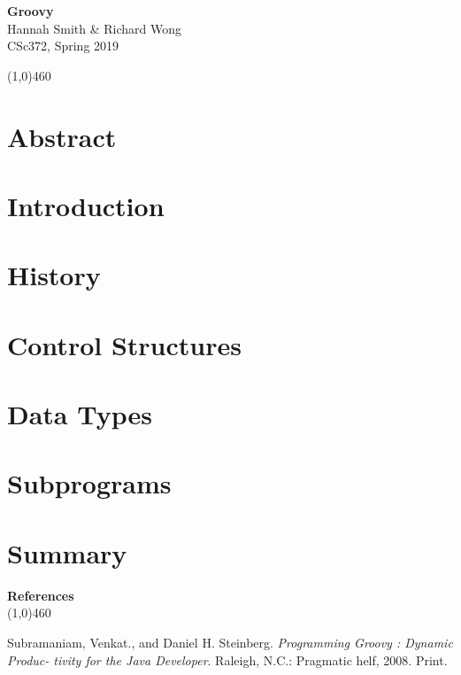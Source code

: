 \documentclass[12pt]{article}
\begin{document}
\begin{center}
    {\bf \large\fontsize{15}{15} \selectfont Groovy} \\
    {Hannah Smith \& Richard Wong} \\
    {CSc372, Spring 2019}\\
\end{center}

\begin{center}
\line(1,0){460}
\end{center}

\section*{\fontsize{14}{15}\selectfont Abstract}

\section*{\fontsize{14}{15}\selectfont Introduction}

\section*{\fontsize{14}{15}\selectfont History}

\section*{\fontsize{14}{15}\selectfont Control Structures}

\section*{\fontsize{14}{15}\selectfont Data Types}

\section*{\fontsize{14}{15}\selectfont Subprograms}

\section*{\fontsize{14}{15}\selectfont Summary}


\newpage
\begin{center}
    {\bf \large\fontsize{15}{15} \selectfont References} \\
    \line(1,0){460}
\end{center}

\vspace{0.5cm}

\noindent Subramaniam, Venkat., and Daniel H. Steinberg. \textit{Programming Groovy : Dynamic Produc- \indent tivity for the Java Developer}. Raleigh, N.C.: Pragmatic helf, 2008. Print.
\\
\end{document}
